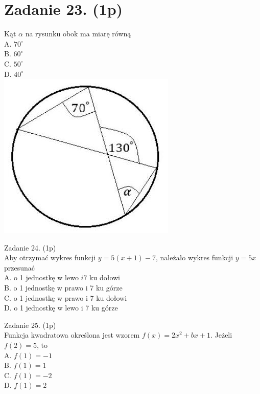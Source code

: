 \documentclass[10pt]{article}
\begin{document}
\section*{Zadanie 23. (1p)}
Kąt \(\alpha\) na rysunku obok ma miarę równą\\
A. \(70^{\circ}\)\\
B. \(60^{\circ}\)\\
C. \(50^{\circ}\)\\
D. \(40^{\circ}\)\\
\includegraphics[max width=\textwidth, center]{2024_11_21_be8c615186155473dc68g-06}

Zadanie 24. (1p)\\
Aby otrzymać wykres funkcji \(y=5(x+1)-7\), należało wykres funkcji \(y=5 x\) przesunać\\
A. o 1 jednostkę w lewo \(i 7\) ku dołowi\\
B. o 1 jednostkę w prawo i 7 ku górze\\
C. o 1 jednostkę w prawo i 7 ku dołowi\\
D. o 1 jednostkę w lewo i 7 ku górze

Zadanie 25. (1p)\\
Funkcja kwadratowa określona jest wzorem \(f(x)=2 x^{2}+b x+1\). Jeżeli \(f(2)=5\), to\\
A. \(f(1)=-1\)\\
B. \(f(1)=1\)\\
C. \(f(1)=-2\)\\
D. \(f(1)=2\)
\end{document}
